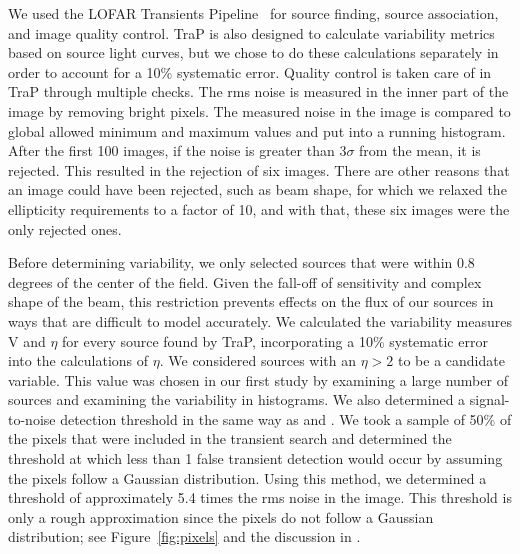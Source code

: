 \documentclass[12pt]{article}
\begin{document}
We used the LOFAR Transients Pipeline~\citep[{\sc TraP};][]{2015A&C....11...25S} for source finding, source association, and image quality control. TraP is also designed to calculate variability metrics based on source light curves, but we chose to do these calculations separately in order to account for a 10\% systematic error. Quality control is taken care of in TraP through multiple checks. The rms noise is measured in the inner part of the image by removing bright pixels. The measured noise in the image is compared to global allowed minimum and maximum values and put into a running histogram. After the first 100 images, if the noise is greater than 3$\sigma$ from the mean, it is rejected. This resulted in the rejection of six images. There are other reasons that an image could have been rejected, such as beam shape, for which we relaxed the ellipticity requirements to a factor of 10, and with that, these six images were the only rejected ones. 

Before determining variability, we only selected sources that were within 0.8 degrees of the center of the field. Given the fall-off of sensitivity and complex shape of the beam, this restriction prevents effects on the flux of our sources in ways that are difficult to model accurately. We calculated the variability measures V and $\eta$ for every source found by TraP, incorporating a 10\% systematic error into the calculations of $\eta$. We considered sources with an $\eta > 2$ to be a candidate variable. This value was chosen in our first study \citep{commensal1} by examining a large number of sources and examining the variability in histograms.  We also determined a signal-to-noise detection threshold in the same way as \citet{2022MNRAS.517.2894R} and \citet{commensal1}. We took a sample of 50\% of the pixels that were included in the transient search and determined the threshold at which less than 1 false transient detection would occur by assuming the pixels follow a Gaussian distribution. Using this method, we determined a threshold of approximately 5.4 times the rms noise in the image. This threshold is only a rough approximation since the pixels do not follow a Gaussian distribution; see Figure~\ref{fig:pixels} and the discussion in \citet{2022MNRAS.517.2894R}. 
\end{document}
